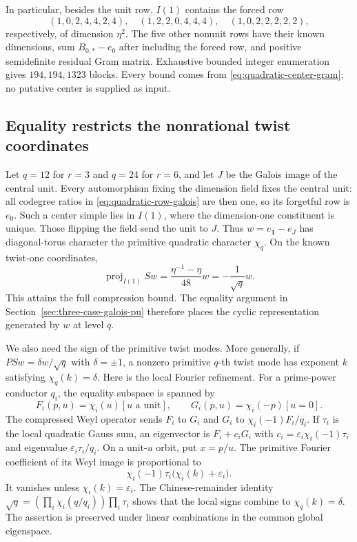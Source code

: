 In particular, besides the unit row, $I(1)$ contains the forced row
\[
 (1,0,2,4,4,2,4),\quad(1,2,2,0,4,4,4),\quad
 (1,0,2,2,2,2,2),
\]
respectively, of dimension $\eta^2$. The five other nonunit rows have
their known dimensions, sum $B_{0,*}-e_0$ after including the forced
row, and positive semidefinite residual Gram matrix. Exhaustive bounded
integer enumeration gives $194,194,1323$ blocks. Every bound comes
from \eqref{eq:quadratic-center-gram}; no putative center is supplied
as input.

\subsection{Equality restricts the nonrational twist coordinates}
Let $q=12$ for $r=3$ and $q=24$ for $r=6$, and let $J$ be the
Galois image of the central unit. Every automorphism fixing the
dimension field fixes the central unit: all codegree ratios in
\eqref{eq:quadratic-row-galois} are then one, so its forgetful row
is $e_0$. Such a center simple lies in $I(1)$, where the dimension-one
constituent is unique. Those flipping the field send the unit to $J$.
Thus $w=e_{\mathbf1}-e_J$ has diagonal-torus character the primitive
quadratic character $\chi_q$. On the known twist-one coordinates,
\[
 \operatorname{proj}_{I(1)}Sw
   =\frac{\eta^{-1}-\eta}{48}w=-\frac1{\sqrt q}w.
\]
This attains the full compression bound. The equality argument in
Section~\ref{sec:three-case-galois-pu} therefore places the cyclic
representation generated by $w$ at level $q$.

We also need the sign of the primitive twist modes. More generally,
if $PSw=\delta w/\sqrt q$ with $\delta=\pm1$, a nonzero primitive
$q$-th twist mode has exponent $k$ satisfying $\chi_q(k)=\delta$.
Here is the local Fourier refinement. For a prime-power conductor
$q_i$, the equality subspace is spanned by
\[
 F_i(p,u)=\chi_i(u)[u\text{ a unit}],\qquad
 G_i(p,u)=\chi_i(-p)[u=0].
\]
The compressed Weyl operator sends $F_i$ to $G_i$ and $G_i$ to
$\chi_i(-1)F_i/q_i$. If $\tau_i$ is the local quadratic Gauss sum,
an eigenvector is $F_i+c_iG_i$ with
$c_i=\varepsilon_i\chi_i(-1)\tau_i$ and eigenvalue
$\varepsilon_i\tau_i/q_i$. On a unit-$u$ orbit, put $x=p/u$.
The primitive Fourier coefficient of its Weyl image is proportional to
\[
 \chi_i(-1)\tau_i\bigl(\chi_i(k)+\varepsilon_i\bigr).
\]
It vanishes unless $\chi_i(k)=\varepsilon_i$.
The Chinese-remainder identity
$\sqrt q=(\prod_i\chi_i(q/q_i))\prod_i\tau_i$ shows that the local
signs combine to $\chi_q(k)=\delta$. The assertion is preserved
under linear combinations in the common global eigenspace.

